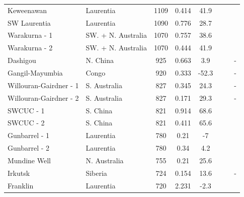 \documentclass[11pt,letterpaper]{article}
\begin{document}
\begin{table}
{\begin{tabular}{l l c c c l l l}
    Keweenawan & Laurentia & 1109 & 0.414 & 41.9 & \citet{Davis1997a} & \citet{Ernst2017a} & \citet{Swanson-Hysell2014b} \\ \vspace{0.2 cm}
    SW Laurentia & Laurentia & 1090 & 0.776 & 28.7 & \citet{Weil2003a} & \citet{Bright2014a} & \citet{Weil2003a} \\ \vspace{0.2 cm}
    Warakurna - 1 & SW. + N. Australia & 1070 & 0.757 & 38.6 & \citet{Wingate2002a} & \citet{Ernst2017a} & \citet{Wingate2002a} \\ \vspace{0.2 cm}
    Warakurna - 2 & SW. + N. Australia & 1070 & 0.444 & 41.9 & \citet{Wingate2002a} & \citet{Ernst2017a} & \citet{Wingate2002a} \\ \vspace{0.2 cm}
    Dashigou & N. China & 925 & 0.663 & 3.9 & \citet{Peng2011a} & \citet{Pirajno2013a} & - \\ \vspace{0.2 cm}
    Gangil-Mayumbia & Congo & 920 & 0.333 & -52.3 & \citet{Tack2001a} & \citet{Ernst2017a} & - \\ \vspace{0.2 cm}
    Willouran-Gairdner - 1 & S. Australia & 827 & 0.345 & 24.3 & \citet{Wingate1998a} & \citet{Ernst2017a} & - \\ \vspace{0.2 cm}
    Willouran-Gairdner - 2 & S. Australia & 827 & 0.171 & 29.3 & \citet{Wingate1998a} & \citet{Ernst2017a} & - \\ \vspace{0.2 cm}
    SWCUC - 1 & S. China & 821 & 0.914 & 68.6 & \citet{Wang2016b} & \citet{Ernst2017a} & \citet{Li2004a} \\ \vspace{0.2 cm}
    SWCUC - 2 & S. China & 821 & 0.411 & 65.6 & \citet{Wang2016b} & \citet{Ernst2017a} & \citet{Li2004a} \\ \vspace{0.2 cm}
    Gunbarrel - 1 & Laurentia & 780 & 0.21 & -7 & \citet{Harlan2003a} & \citet{Ernst2017a} & \citet{Park1989a} \\ \vspace{0.2 cm}
    Gunbarrel - 2 & Laurentia & 780 & 0.34 & 4.2 & \citet{Harlan2003a} & \citet{Ernst2017a} & \citet{Park1989a} \\ \vspace{0.2 cm}
    Mundine Well & N. Australia & 755 & 0.21 & 25.6 & \citet{Wingate2000a} & \citet{Ernst2017a} & \citet{Wingate2000a} \\ \vspace{0.2 cm}
    Irkutsk & Siberia & 724 & 0.154 & 13.6 & \citet{Ernst2016a} & \citet{Ernst2016a} & - \\ \vspace{0.2 cm}
    Franklin & Laurentia & 720 & 2.231 & -2.3 & \citet{Denyszyn2009a} & \citet{Ernst2017a} & \citet{Denyszyn2009a} \\
    \hline
	\end{tabular}}
	

\end{table}
\end{document}
